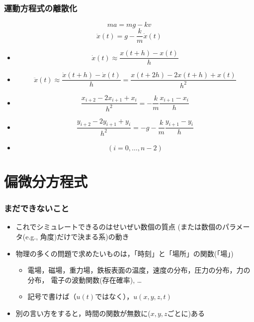 \documentclass[12pt,dvipdfmx]{beamer}
\newcommand{\ao}[1]{{\color{blue}#1}}
\begin{document}
\begin{frame}
  \frametitle{運動方程式の離散化}

    \[ ma = mg - kv \]
    \[ \ddot{x}(t) = g - \frac{k}{m} \dot{x}(t) \]

    \begin{itemize}
    \item
      \[ \dot{{x}}(t) \approx \frac{{x(t+h) - x(t)}}{{h}} \]
    \item
      \[ \ddot{{x}}(t) \approx \frac{{\dot{{x}}(t+h) - \dot{{x}}(t)}}{{h}} = \frac{{x(t+2h) - 2x(t+h) + x(t)}}{{h^2}}  \]
      
    \item
      \[ \frac{{x_{{i+2}} - 2 x_{{i+1}} + x_i}}{{h^2}} =     - \frac{{k}}{{m}} \frac{{x_{{i+1}} - x_i}}{{h}} \]
      
    \item 
      \[ \frac{{y_{{i+2}} - 2 y_{{i+1}} + y_i}}{{h^2}} = - g - \frac{{k}}{{m}} \frac{{y_{{i+1}} - y_i}}{{h}} \]
    \item \[ (i = 0, \ldots, n - 2) \]
    \end{itemize}
\end{frame}
\fi

\section{偏微分方程式}

\begin{frame}
\frametitle{まだできないこと}
\begin{itemize}
\item これでシミュレートできるのはせいぜい数個の質点
(または数個のパラメータ(e.g., 角度)だけで決まる系)の動き

\item 物理の多くの問題で求めたいものは，「時刻」と「場所」の関数\ao{(「場」)}
  \begin{itemize}
  \item 電場，磁場，重力場，鉄板表面の温度，速度の分布，圧力の分布，力の分布，
    電子の波動関数(存在確率), \ldots
  \item 記号で書けば（$u(t)$ではなく），\ao{$u(x, y, z, t)$}
  \end{itemize}
\item 別の言い方をすると，\ao{時間の関数が無数に($x, y, z$ごとに)ある}
\end{itemize}
\end{frame}
\end{document}

